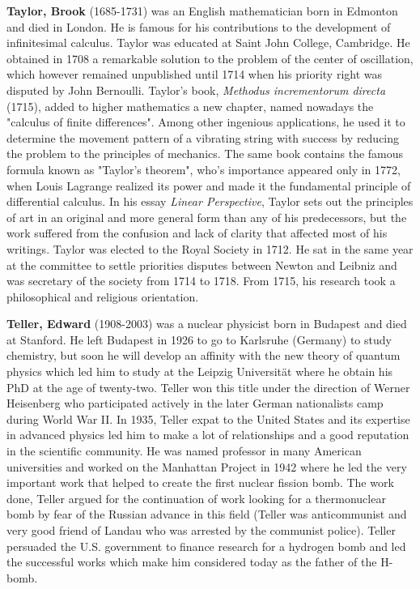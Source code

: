 {}
\label{sec:T}

\textbf{Taylor, Brook} (1685-1731) was an English mathematician born in Edmonton and died in London. He is famous for his contributions to the development of infinitesimal calculus. Taylor was educated at Saint John College, Cambridge. He obtained in 1708 a remarkable solution to the problem of the center of oscillation, which however remained unpublished until 1714 when his priority right was disputed by John Bernoulli. Taylor's book, \textit{Methodus incrementorum directa} (1715), added to higher mathematics a new chapter, named nowadays the "calculus of finite differences". Among other ingenious applications, he used it to determine the movement pattern of a vibrating string with success by reducing the problem to the principles of mechanics. The same book contains the famous formula known as "Taylor's theorem", who's importance appeared only in 1772, when Louis Lagrange realized its power and made it the fundamental principle of differential calculus. In his essay \textit{Linear Perspective}, Taylor sets out the principles of art in an original and more general form than any of his predecessors, but the work suffered from the confusion and lack of clarity that affected most of his writings. Taylor was elected to the Royal Society in 1712. He sat in the same year at the committee to settle priorities disputes between Newton and Leibniz and was secretary of the society from 1714 to 1718. From 1715, his research took a philosophical and religious orientation.

\textbf{Teller, Edward} (1908-2003) was a nuclear physicist born in Budapest and died at Stanford. He left Budapest in 1926 to go to Karlsruhe (Germany) to study chemistry, but soon he will develop an affinity with the new theory of quantum physics which led him to study at the Leipzig Universität where he obtain his PhD at the age of twenty-two. Teller won this title under the direction of Werner Heisenberg who participated actively in the later German nationalists camp during World War II. In 1935, Teller expat to the United States and its expertise in advanced physics led him to make a lot of relationships and a good reputation in the scientific community. He was named professor in many American universities and worked on the Manhattan Project in 1942 where he led the very important work that helped to create the first nuclear fission bomb. The work done, Teller argued for the continuation of work looking for a thermonuclear bomb by fear of the Russian advance in this field (Teller was anticommunist and very good friend of Landau who was arrested by the communist police). Teller persuaded the U.S. government to finance research for a hydrogen bomb and led the successful works which make him considered today as the father of the H-bomb.

